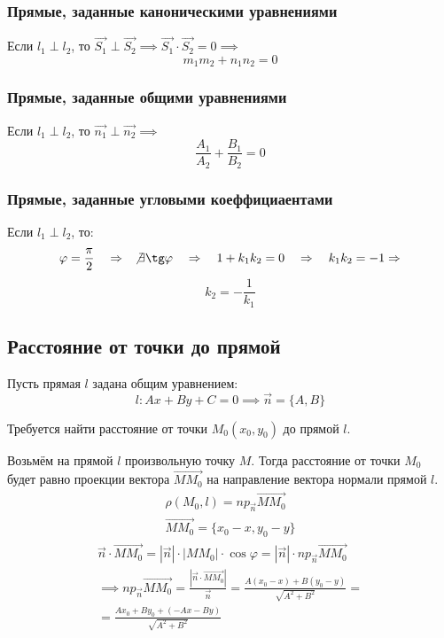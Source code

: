 \subsubsection{Прямые, заданные каноническими уравнениями}

Если $l_1 \perp l_2$, 
то $\vec{S_1} \perp \vec{S_2} \implies \vec{S_1} \cdot \vec{S_2} = 0 \implies$ \[
  \boxed{m_1 m_2 + n_1 n_2 = 0}
\] 

\subsubsection{Прямые, заданные общими уравнениями}

Если $l_1 \perp l_2$, 
то $\vec{n_1} \perp \vec{n_2} \implies$ \[
  \boxed{\frac{A_1}{A_2} + \frac{B_1}{B_2} = 0}
\] 

\subsubsection{Прямые, заданные угловыми коеффициаентами}

Если $l_1 \perp l_2$, то:
\begin{gather*}
  \varphi = \frac{\pi}{2} \quad \implies \quad \not\exists \tg \varphi \quad \implies \quad 1 + k_1 k_2 =0 \quad \implies \quad k_1 k_2 = -1 \implies
\end{gather*} \[
  \boxed{k_2 = -\frac{1}{k_1}}
\] 

\subsection{Расстояние от точки до прямой}

Пусть прямая $l$ задана общим уравнением:  \[
l: Ax + By + C = 0 \implies \vec{n} = \{A, B\} 
\] 

Требуется найти расстояние от точки $M_0\left(x_0, y_0  \right)$ до прямой $l$.

Возьмём на прямой $l$ произвольную точку $M$. Тогда расстояние от точки $M_0$ будет равно проекции вектора $\overrightarrow{M M_0}$ на направление вектора нормали прямой $l$.
\begin{gather*}
  \rho (M_0, l) = np_{\vec{n}} \overrightarrow{M M_0} \\
  \overrightarrow{M M_0} = \{x_0 - x, y_0 - y\} 
\end{gather*}
\begin{gather*}
  \vec{n} \cdot \overrightarrow{M M_0} = |\vec{n}| \cdot |M M_0| \cdot \cos \varphi = |\vec{n}| \cdot np_{\vec{n}} \overrightarrow{M M_0} \\
  \implies np_{\vec{n}} \overrightarrow{M M_0} = \frac{|\vec{n} \cdot \overrightarrow{M M_0}|}{\vec{n}} = \frac{A(x_0 - x) + B(y_0 - y)}{\sqrt{A^2 + B^2}} = \\
  = \frac{A x_0 + B y_0 + (-Ax - By)}{\sqrt{A^2 + B^2} }
\end{gather*}

